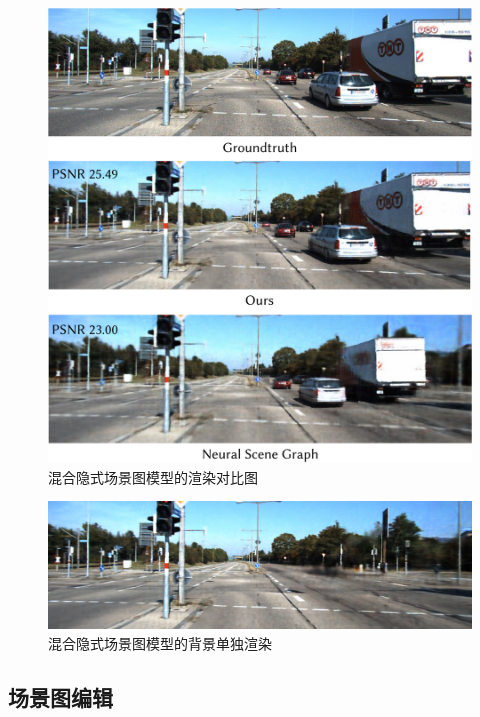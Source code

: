 \begin{figure}[ht]
    \centering
    \includegraphics[width=\textwidth]{undergraduate-thesis/images/experiments/scene-graph rgb qualitative.pdf}
    \caption{混合隐式场景图模型的渲染对比图}
    \label{fig:scene-graph rgb render}
\end{figure}

\begin{figure}[ht]
    \centering
    \includegraphics[width=\textwidth]{undergraduate-thesis/images/experiments/scene-graph background.png}
    \caption{混合隐式场景图模型的背景单独渲染}
    \label{fig:scene-graph background}
\end{figure}

\subsection{场景图编辑}

